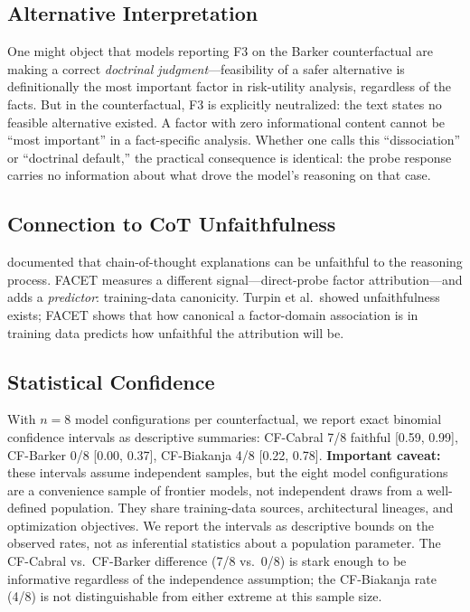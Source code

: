 \documentclass[11pt,twocolumn]{article}
\begin{document}
\subsection{Alternative Interpretation}

One might object that models reporting F3 on the Barker counterfactual are making a correct \emph{doctrinal judgment}---feasibility of a safer alternative is definitionally the most important factor in risk-utility analysis, regardless of the facts. But in the counterfactual, F3 is explicitly neutralized: the text states no feasible alternative existed. A factor with zero informational content cannot be ``most important'' in a fact-specific analysis. Whether one calls this ``dissociation'' or ``doctrinal default,'' the practical consequence is identical: the probe response carries no information about what drove the model's reasoning on that case.

\subsection{Connection to CoT Unfaithfulness}

\citet{turpin2023} documented that chain-of-thought explanations can be unfaithful to the reasoning process. FACET measures a different signal---direct-probe factor attribution---and adds a \emph{predictor}: training-data canonicity. Turpin et al.\ showed unfaithfulness exists; FACET shows that how canonical a factor-domain association is in training data predicts how unfaithful the attribution will be.

\subsection{Statistical Confidence}

With $n=8$ model configurations per counterfactual, we report exact binomial confidence intervals as descriptive summaries: CF-Cabral 7/8 faithful [0.59, 0.99], CF-Barker 0/8 [0.00, 0.37], CF-Biakanja 4/8 [0.22, 0.78]. \textbf{Important caveat:} these intervals assume independent samples, but the eight model configurations are a convenience sample of frontier models, not independent draws from a well-defined population. They share training-data sources, architectural lineages, and optimization objectives. We report the intervals as descriptive bounds on the observed rates, not as inferential statistics about a population parameter. The CF-Cabral vs.\ CF-Barker difference (7/8 vs.\ 0/8) is stark enough to be informative regardless of the independence assumption; the CF-Biakanja rate (4/8) is not distinguishable from either extreme at this sample size.
\end{document}
